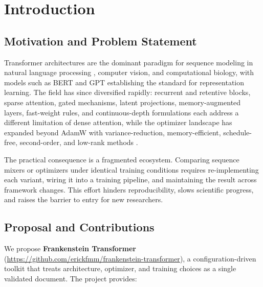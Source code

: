 \section{Introduction}

\subsection{Motivation and Problem Statement}

Transformer architectures are the dominant paradigm for sequence modeling in natural language processing \citep{vaswani_attention_2017}, computer vision, and computational biology, with models such as BERT \citep{devlin_bert_2019} and GPT establishing the standard for representation learning. The field has since diversified rapidly: recurrent and retentive blocks, sparse attention, gated mechanisms, latent projections, memory-augmented layers, fast-weight rules, and continuous-depth formulations each address a different limitation of dense attention, while the optimizer landscape has expanded beyond AdamW with variance-reduction, memory-efficient, schedule-free, second-order, and low-rank methods \citep{child_sparse_transformer_2019,sun_retentive_2023,gu_mamba_2023,behrouz_titans_2025,ramapuram_theory_2024,xie_adan_2022,pagliardini_ademamix_2024,yuan_mars_2024,shazeer_adafactor_2018,zhao_galore_2024,defazio_road_2024,gupta_shampoo_2018,vyas_soap_2024}.

The practical consequence is a fragmented ecosystem. Comparing sequence mixers or optimizers under identical training conditions requires re-implementing each variant, wiring it into a training pipeline, and maintaining the result across framework changes. This effort hinders reproducibility, slows scientific progress, and raises the barrier to entry for new researchers.

\subsection{Proposal and Contributions}

We propose \textbf{Frankenstein Transformer} (\url{https://github.com/erickfmm/frankenstein-transformer}), a configuration-driven toolkit that treats architecture, optimizer, and training choices as a single validated document. The project provides:

